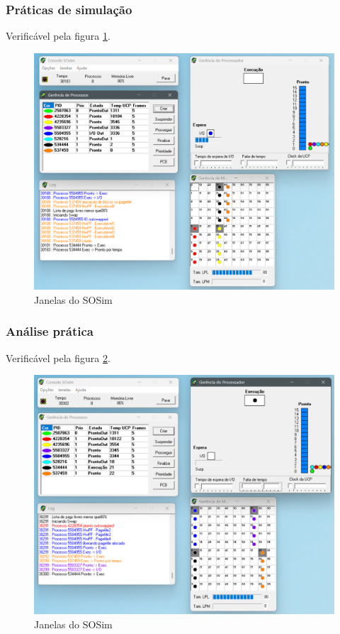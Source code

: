 \documentclass[a4paper,12pt]{article} %
\begin{document}
\subsubsection[]{Práticas de simulação}
Verificável pela figura \ref{fig7}.
\begin{figure}[htbp]
    \centering
    \includegraphics[scale=0.4]{../fig/fig7.png}
    \caption{Janelas do SOSim}
    \label{fig7}
\end{figure}
\subsubsection[]{Análise prática}
Verificável pela figura \ref{fig8}.
\begin{figure}[htbp]
    \centering
    \includegraphics[scale=0.4]{../fig/fig8.png}
    \caption{Janelas do SOSim}
    \label{fig8}
\end{figure}
\end{document}
